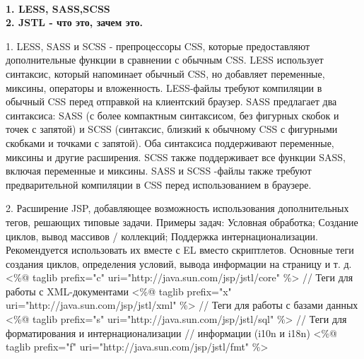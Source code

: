 \documentclass{article}
\begin{document}
\\
\begin{minipage}{.3\textwidth}
    \textbf{1. LESS, SASS,SCSS}\\
    \textbf{2. JSTL - что это, зачем это.}

1. LESS, SASS и SCSS - препроцессоры CSS, которые предоставляют дополнительные функции в сравнении с обычным CSS. LESS использует синтаксис, который напоминает обычный CSS, но добавляет переменные, миксины, операторы и вложенность. LESS-файлы требуют компиляции в обычный CSS перед отправкой на клиентский браузер.
SASS предлагает два синтаксиса: SASS (с более компактным синтаксисом, без фигурных скобок и точек с запятой) и SCSS (синтаксис, близкий к обычному CSS с фигурными скобками и точками с запятой). Оба синтаксиса поддерживают переменные, миксины и другие расширения. SCSS также поддерживает все функции SASS, включая переменные и миксины. SASS и SCSS -файлы также требуют предварительной компиляции в CSS перед использованием в браузере.

2. Расширение JSP, добавляющее возможность использования дополнительных тегов, решающих типовые задачи. Примеры задач: Условная обработка; Создание циклов, вывод массивов / коллекций; Поддержка интернационализации. Рекомендуется использовать их вместе с EL вместо скриптлетов.
Основные теги создания циклов, определения условий, вывода информации на страницу и т. д.
<\%@ taglib prefix="c"
uri="http://java.sun.com/jsp/jstl/core" \%>
// Теги для работы с XML-документами
<\%@ taglib prefix="x"
uri="http://java.sun.com/jsp/jstl/xml" \%>
// Теги для работы с базами данных
<\%@ taglib prefix="s"
uri="http://java.sun.com/jsp/jstl/sql" \%>
// Теги для форматирования и интернационализации // информации (i10n и i18n)
<\%@ taglib prefix="f"
uri="http://java.sun.com/jsp/jstl/fmt" \%>
\end{minipage}
\hfill
\end{document}
